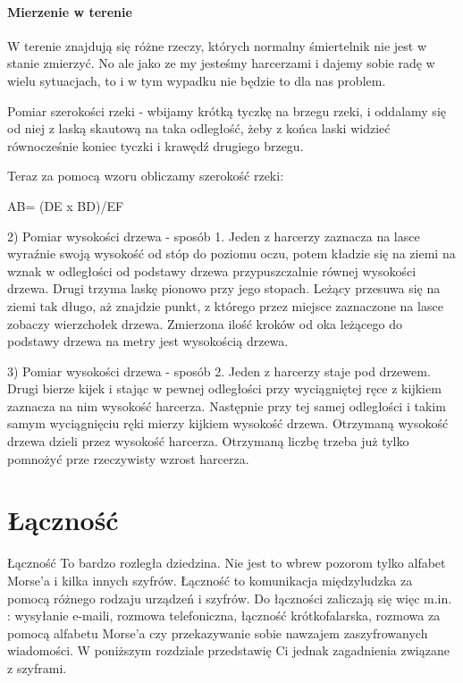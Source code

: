 \paragraph{Mierzenie w terenie}

W terenie znajdują się różne rzeczy, których normalny śmiertelnik nie jest w stanie zmierzyć. No ale jako ze my jesteśmy harcerzami i dajemy sobie radę w wielu sytuacjach, to i w tym wypadku nie będzie to dla nas problem.

Pomiar szerokości rzeki - wbijamy krótką tyczkę na brzegu rzeki, i oddalamy się od niej z laską skautową na taka odległość, żeby z końca laski widzieć równocześnie koniec tyczki i krawędź drugiego brzegu.

Teraz za pomocą wzoru obliczamy szerokość rzeki:

AB= (DE x BD)/EF


2) Pomiar wysokości drzewa - sposób 1. 
Jeden z harcerzy zaznacza na lasce wyraźnie swoją wysokość od stóp do poziomu oczu, potem kładzie się na ziemi na wznak w odległości od podstawy drzewa przypuszczalnie równej wysokości drzewa. 
Drugi trzyma laskę pionowo przy jego stopach. 
Leżący przesuwa się na ziemi tak długo, aż znajdzie punkt, z którego przez miejsce zaznaczone na lasce zobaczy wierzchołek drzewa. 
Zmierzona ilość kroków od oka leżącego do podstawy drzewa na metry jest wysokością drzewa.

3) Pomiar wysokości drzewa - sposób 2. Jeden z harcerzy staje pod drzewem. 
Drugi bierze kijek i stając w pewnej odległości przy wyciągniętej ręce z kijkiem zaznacza na nim wysokość harcerza. 
Następnie przy tej samej odległości i takim samym wyciągnięciu ręki mierzy kijkiem wysokość drzewa. 
Otrzymaną wysokość drzewa dzieli przez wysokość harcerza. 
Otrzymaną liczbę trzeba już tylko pomnożyć prze rzeczywisty wzrost harcerza.

\section{Łączność}
Łączność To bardzo rozległa dziedzina. 
Nie jest to wbrew pozorom tylko alfabet Morse’a i kilka innych szyfrów. 
Łączność to komunikacja międzyludzka za pomocą różnego rodzaju urządzeń i szyfrów. 
Do łączności zaliczają się więc m.in. : wysyłanie e-maili, rozmowa telefoniczna, łączność krótkofalarska, rozmowa za pomocą alfabetu Morse’a czy przekazywanie sobie nawzajem zaszyfrowanych wiadomości. 
W poniższym rozdziale przedstawię Ci jednak zagadnienia związane z szyframi. 
	
